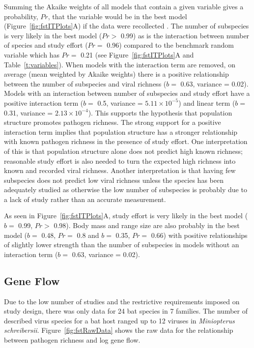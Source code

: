 Summing the Akaike weights of all models that contain a given variable gives a probability, $Pr$, that the variable would be in the best model (Figure~\ref{fig:fstITPlots}A) if the data were recollected \cite{whittingham2006we}.
The number of subspecies is very likely in the best model ($Pr > $ 0.99) as is the interaction between number of species and study effort ($Pr = $ 0.96) compared to the benchmark random variable which has $Pr = $ 0.21 (see Figure~\ref{fig:fstITPlots}A and Table~\ref{t:variables}).
When models with the interaction term are removed, on average (mean weighted by Akaike weights) there is a positive relationship between the number of subspecies and viral richness ($b = $ 0.63, variance = 0.02).
Models with an interaction between number of subspecies and study effort have a positive interaction term ($b = $ 0.5, variance = \ensuremath{5.11\times 10^{-5}}) and linear term ($b = $ 0.31, variance = \ensuremath{2.13\times 10^{-4}}).
This supports the hypothesis that population structure promotes pathogen richness.
The strong support for a positive interaction term implies that population structure has a stronger relationship with known pathogen richness in the presence of study effort.
One interpretation of this is that population structure alone does not predict high known richness; reasonable study effort is also needed to turn the expected high richness into known and recorded viral richness.
Another interpretation is that having few subspecies does not predict low viral richness unless the species has been adequately studied as otherwise the low number of subspecies is probably due to a lack of study rather than an accurate measurement.


As seen in Figure~\ref{fig:fstITPlots}A, study effort is very likely in the best model ($b = $ 0.99, $Pr > $ 0.98).
Body mass and range size are also probably in the best model ($b = $ 0.48, $Pr = $ 0.8 and $b = $ 0.35, $Pr = $ 0.66) with positive relationships of slightly lower strength than the number of subspecies in models without an interaction term ($b = $ 0.63, variance = 0.02).	





\subsection{Gene Flow}

Due to the low number of studies and the restrictive requirements imposed on study design, there was only data for 24 bat species in 7 families.
The number of described virus species for a bat host ranged up to 12 viruses in \emph{Miniopterus schreibersii}.
Figure~\ref{fig:fstRawData} shows the raw data for the relationship between pathogen richness and log gene flow.



